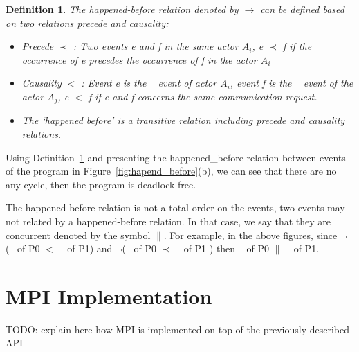 \documentclass[a4paper,11pt]{article}
\newtheorem{definition}{Definition}
\begin{document}
\begin{definition}
	  	\label{def:happedBefore2}
	The happened-before relation  denoted by  $\rightarrow $ can be defined based on two relations precede and causality: \begin{itemize}
		\item Precede $ \prec$ :  Two events e and f in the same actor $A_i$, e $ \prec$ f if the occurrence of e precedes the occurrence of f in the actor $A_i$  
		\item Causality $<$ : Event e is the \asynsend~ event of actor $A_i$, event f is the \wait~ event of the actor $A_j$,  e $<$ f if e and f concerns the same communication request.
		\item The ‘happened before’ is a transitive relation including precede and causality relations. 
	\end{itemize}\end{definition} 

Using Definition~\ref{def:happedBefore2} and presenting the happened\_before relation between events of the program in Figure~\ref{fig:hapend_before}(b), we can see that there are no any cycle, then the program is deadlock-free.

The happened-before relation is not a total order on the events, two events may not related by a happened-before relation. In that case, we say that they are concurrent denoted by the symbol $\parallel$. For example, in the above figures, since $\neg$(\asynsend~ of P0 $<$ \asynsend~ of P1) and $\neg$(\asynsend~ of P0 $ \prec$  \asynsend~ of P1 ) then \asynsend~ of P0 $\parallel$ \asynsend~ of P1.  

\section{MPI Implementation}
TODO: explain here how MPI is implemented on top of the previously described API

%
%
	
\end{document}

